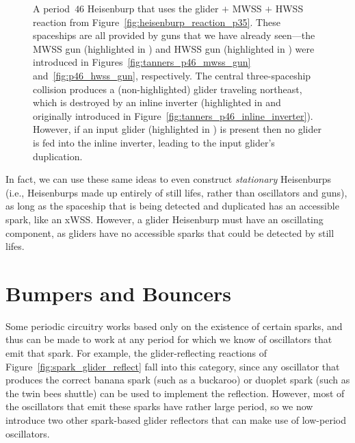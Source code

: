 \begin{figure}[!htb]
	\centering
	\caption{A period~$46$ Heisenburp that uses the glider $+$ MWSS $+$ HWSS reaction from Figure~\ref{fig:heisenburp_reaction_p35}. These spaceships are all provided by guns that we have already seen---the MWSS gun (highlighted in ) and HWSS gun (highlighted in ) were introduced in Figures~\ref{fig:tanners_p46_mwss_gun} and~\ref{fig:p46_hwss_gun}, respectively. The central three-spaceship collision produces a (non-highlighted) glider traveling northeast, which is destroyed by an inline inverter (highlighted in  and originally introduced in Figure~\ref{fig:tanners_p46_inline_inverter}). However, if an input glider (highlighted in ) is present then no glider is fed into the inline inverter, leading to the input glider's duplication.}\label{fig:p46_heisenburp_constructed}
\end{figure}

In fact, we can use these same ideas to even construct \emph{stationary} Heisenburps (i.e., Heisenburps made up entirely of still lifes, rather than oscillators and guns), as long as the spaceship that is being detected and duplicated has an accessible spark, like an xWSS. However, a glider Heisenburp must have an oscillating component, as gliders have no accessible sparks that could be detected by still lifes.


\section{Bumpers and Bouncers}\label{sec:bumper_bouncer}

Some periodic circuitry works based only on the existence of certain sparks, and thus can be made to work at any period for which we know of oscillators that emit that spark. For example, the glider-reflecting reactions of Figure~\ref{fig:spark_glider_reflect} fall into this category, since any oscillator that produces the correct banana spark (such as a buckaroo) or duoplet spark (such as the twin bees shuttle) can be used to implement the reflection. However, most of the oscillators that emit these sparks have rather large period, so we now introduce two other spark-based glider reflectors that can make use of low-period oscillators.

